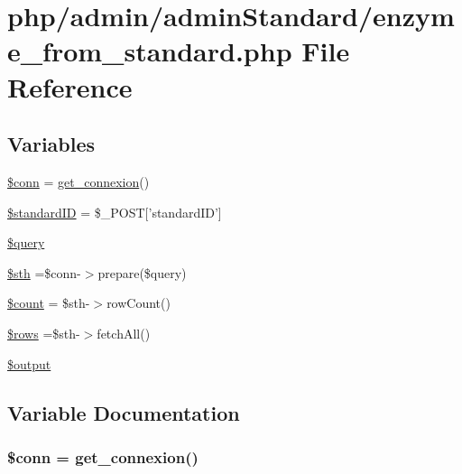 \hypertarget{admin_2admin_standard_2enzyme__from__standard_8php}{\section{php/admin/admin\-Standard/enzyme\-\_\-from\-\_\-standard.php File Reference}
\label{admin_2admin_standard_2enzyme__from__standard_8php}
}
\subsection*{Variables}
\begin{DoxyCompactItemize}
\item 
\hyperlink{admin_2admin_standard_2enzyme__from__standard_8php_aa8a5a87b9c1a6a0819b88447cbe41877}{\$conn} = \hyperlink{php__functions_8php_ace18bc10f3fd08f92688ac743e0d8c2e}{get\-\_\-connexion}()
\item 
\hyperlink{admin_2admin_standard_2enzyme__from__standard_8php_a0c541a369e4a0434108a7d145751bb23}{\$standard\-I\-D} = \$\-\_\-\-P\-O\-S\-T\mbox{[}'standard\-I\-D'\mbox{]}
\item 
\hyperlink{admin_2admin_standard_2enzyme__from__standard_8php_af59a5f7cd609e592c41dc3643efd3c98}{\$query}
\item 
\hyperlink{admin_2admin_standard_2enzyme__from__standard_8php_afa9126f9664959c02795be300a135f93}{\$sth} =\$conn-\/$>$prepare(\$query)
\item 
\hyperlink{admin_2admin_standard_2enzyme__from__standard_8php_af789423037bbc89dc7c850e761177570}{\$count} = \$sth-\/$>$row\-Count()
\item 
\hyperlink{admin_2admin_standard_2enzyme__from__standard_8php_ace2ec39e7df3899fa8df9640ec274b03}{\$rows} =\$sth-\/$>$fetch\-All()
\item 
\hyperlink{admin_2admin_standard_2enzyme__from__standard_8php_a73004ce9cd673c1bfafd1dc351134797}{\$output}
\end{DoxyCompactItemize}


\subsection{Variable Documentation}
\hypertarget{admin_2admin_standard_2enzyme__from__standard_8php_aa8a5a87b9c1a6a0819b88447cbe41877}{
\subsubsection[{\$conn}]{\setlength{\rightskip}{0pt plus 5cm}\$conn = {\bf get\-\_\-connexion}()}}\label{admin_2admin_standard_2enzyme__from__standard_8php_aa8a5a87b9c1a6a0819b88447cbe41877}


